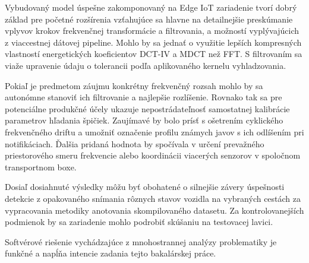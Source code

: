 Vybudovaný model úspešne zakomponovaný na Edge IoT zariadenie tvorí dobrý základ pre početné rozšírenia
vzťahujúce sa hlavne na detailnejšie preskúmanie vplyvov krokov frekvenčnej transformácie a filtrovania,
a možností vyplývajúcich z viaccestnej dátovej pipeline. Mohlo by sa jednať o využitie lepších kompresných vlastností
energetických koeficientov DCT-IV a MDCT než FFT. S filtrovaním sa viaže upravenie údaju o tolerancii podľa
aplikovaného kernelu vyhladzovania.

Pokiaľ je predmetom záujmu konkrétny frekvenčný rozsah mohlo by sa autonómne stanoviť ich filtrovanie a najlepšie rozlíšenie.
Rovnako tak sa pre potenciálne produkčné účely ukazuje nepostrádateľnosť samostatnej kalibrácie parametrov hľadania špičiek.
Zaujímavé by bolo prísť s ošetrením cyklického frekvenčného driftu a umožniť označenie profilu známych javov s ich odlíšením pri
notifikáciach. Ďalšia pridaná hodnota by spočívala v určení prevažného priestorového smeru frekvencie alebo koordinácii viacerých senzorov
v spoločnom transportnom boxe.

Dosiaľ dosiahnuté výsledky môžu byť obohatené o silnejšie závery úspešnosti detekcie z opakovaného snímania rôznych stavov
vozidla na vybraných cestách za vypracovania metodiky anotovania skompilovaného datasetu. Za kontrolovanejších podmienok
by sa zariadenie mohlo podrobiť skúšaniu na testovacej lavici.

Softvérové riešenie vychádzajúce z mnohostrannej analýzy problematiky je funkčné a napĺňa intencie
zadania tejto bakalárskej práce.
\cleardoublepage
